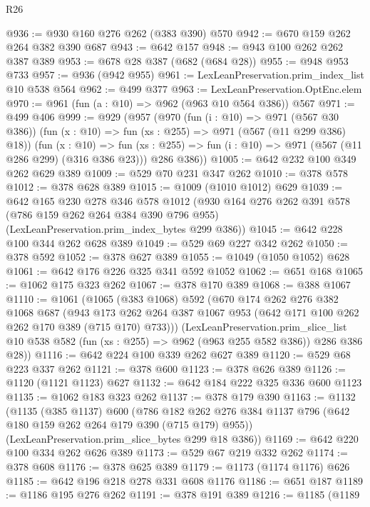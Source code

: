 \begin{lexlean}{R26}
\begin{coremodule}
@936 := @930 @160 @276 @262 (@383 @390) @570
@942 := @670 @159 @262 @264 @382 @390 @687
@943 := @642 @157
@948 := @943 @100 @262 @262 @387 @389
@953 := @678 @28 @387 (@682 (@684 @28))
@955 := @948 @953 @733
@957 := @936 (@942 @955)
@961 := LexLeanPreservation.prim_index_list @10 @538 @564
@962 := @499 @377
@963 := LexLeanPreservation.OptEnc.elem
@970 := @961 (fun (a : @10) => @962 (@963 @10 @564 @386)) @567
@971 := @499 @406
@999 := @929
    (@957
      (@970
        (fun (i : @10) => @971 (@567 @30 @386))
        (fun (x : @10) => fun (xs : @255) => @971 (@567 (@11 @299 @386) @18))
        (fun (x : @10) =>
        fun (xs : @255) => fun (i : @10) => @971 (@567 (@11 @286 @299) (@316 @386 @23)))
        @286
        @386))
@1005 := @642 @232 @100 @349 @262 @629 @389
@1009 := @529 @70 @231 @347 @262
@1010 := @378 @578
@1012 := @378 @628 @389
@1015 := @1009 (@1010 @1012) @629
@1039 := @642
    @165
    @230
    @278
    @346
    @578
    @1012
    (@930
      @164
      @276
      @262
      @391
      @578
      (@786 @159 @262 @264 @384 @390 @796 @955)
      (LexLeanPreservation.prim_index_bytes @299 @386))
@1045 := @642 @228 @100 @344 @262 @628 @389
@1049 := @529 @69 @227 @342 @262
@1050 := @378 @592
@1052 := @378 @627 @389
@1055 := @1049 (@1050 @1052) @628
@1061 := @642 @176 @226 @325 @341 @592 @1052
@1062 := @651 @168
@1065 := @1062 @175 @323 @262
@1067 := @378 @170 @389
@1068 := @388 @1067
@1110 := @1061
    (@1065
      (@383 @1068)
      @592
      (@670
        @174
        @262
        @276
        @382
        @1068
        @687
        (@943 @173 @262 @264 @387 @1067 @953 (@642 @171 @100 @262 @262 @170 @389 (@715 @170) @733)))
      (LexLeanPreservation.prim_slice_list
        @10
        @538
        @582
        (fun (xs : @255) => @962 (@963 @255 @582 @386))
        @286
        @386
        @28))
@1116 := @642 @224 @100 @339 @262 @627 @389
@1120 := @529 @68 @223 @337 @262
@1121 := @378 @600
@1123 := @378 @626 @389
@1126 := @1120 (@1121 @1123) @627
@1132 := @642 @184 @222 @325 @336 @600 @1123
@1135 := @1062 @183 @323 @262
@1137 := @378 @179 @390
@1163 := @1132
    (@1135
      (@385 @1137)
      @600
      (@786 @182 @262 @276 @384 @1137 @796 (@642 @180 @159 @262 @264 @179 @390 (@715 @179) @955))
      (LexLeanPreservation.prim_slice_bytes @299 @18 @386))
@1169 := @642 @220 @100 @334 @262 @626 @389
@1173 := @529 @67 @219 @332 @262
@1174 := @378 @608
@1176 := @378 @625 @389
@1179 := @1173 (@1174 @1176) @626
@1185 := @642 @196 @218 @278 @331 @608 @1176
@1186 := @651 @187
@1189 := @1186 @195 @276 @262
@1191 := @378 @191 @389
@1216 := @1185
    (@1189

\end{coremodule}
\end{lexlean}
